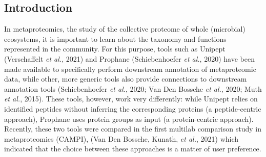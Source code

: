 \hypertarget{introduction-5}{%
\subsection{Introduction}\label{introduction-5}}

In metaproteomics, the study of the collective proteome of whole
(microbial) ecosystems, it is important to learn about the taxonomy and
functions represented in the community. For this purpose, tools such as
Unipept (Verschaffelt \emph{et al.}, 2021) and Prophane (Schiebenhoefer
\emph{et al.}, 2020) have been made available to specifically perform
downstream annotation of metaproteomic data, while other, more generic
tools also provide connections to downstream annotation tools
(Schiebenhoefer \emph{et al.}, 2020; Van Den Bossche \emph{et al.},
2020; Muth \emph{et al.}, 2015). These tools, however, work very
differently: while Unipept relies on identified peptides without
inferring the corresponding proteins (a peptide-centric approach),
Prophane uses protein groups as input (a protein-centric approach).
Recently, these two tools were compared in the first multilab comparison
study in metaproteomics (CAMPI), (Van Den Bossche, Kunath, \emph{et
al.}, 2021) which indicated that the choice between these approaches is
a matter of user preference.

